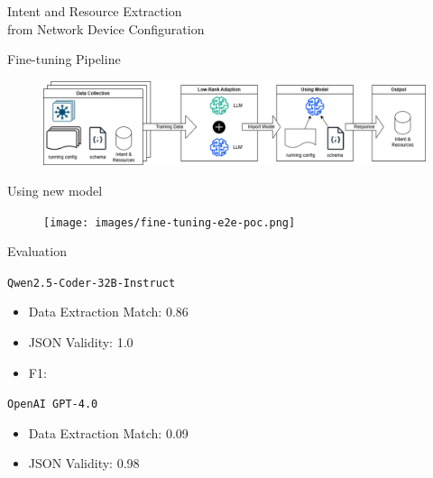 \documentclass[aspectratio=169]{beamer}
\begin{document}
\begin{frame}{}

  \begin{center}
    \Huge \color[rgb]{1,1,1}Intent and Resource Extraction \\ from Network Device Configuration
  \end{center}

\end{frame}


\begin{frame}{Fine-tuning Pipeline}

      \begin{figure}
        \includegraphics[width = \textwidth]{images/fine-tuning-pipeline.png}
      \end{figure}

\end{frame}

\begin{frame}{Using new model}

  \begin{figure}
    \texttt{[image: images/fine-tuning-e2e-poc.png]}
  \end{figure}

\end{frame}

\begin{frame}{Evaluation}

  \texttt{Qwen2.5-Coder-32B-Instruct}

  \begin{itemize}
    \setlength\itemsep{1em}
    \item Data Extraction Match: 0.86
    \item JSON Validity: 1.0
    \item F1: 
  \end{itemize}

  \texttt{OpenAI GPT-4.0}
  \begin{itemize}
    \setlength\itemsep{1em}
    \item Data Extraction Match: 0.09
    \item JSON Validity: 0.98
  \end{itemize}

\end{frame}
\end{document}
